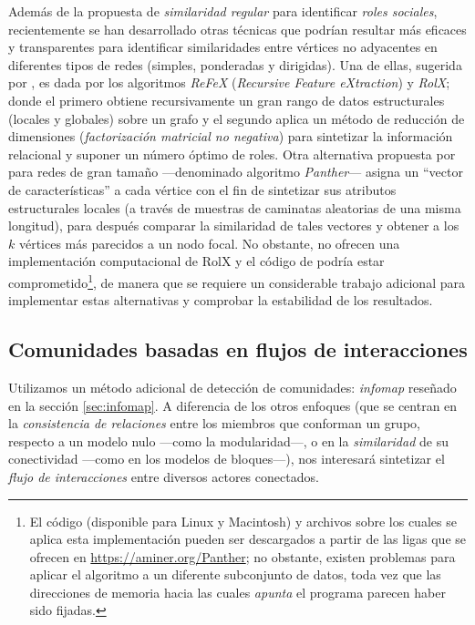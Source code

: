 \documentclass[letterpaper, 11pt]{book}
\theoremstyle{definition}
\theoremstyle{remark}
\begin{document}
Además de la propuesta de \emph{similaridad regular} para identificar \emph{roles sociales}, recientemente se han desarrollado otras técnicas que podrían resultar más eficaces y transparentes para identificar similaridades entre vértices no adyacentes en diferentes tipos de redes (simples, ponderadas y dirigidas). 
Una de ellas, sugerida por \citet{2011_Henderson_RolX}, es dada por los algoritmos \emph{ReFeX} (\emph{Recursive Feature eXtraction}) y \emph{RolX}; donde el primero obtiene recursivamente un gran rango de datos estructurales (locales y globales) sobre un grafo y el segundo aplica un método de reducción de dimensiones (\emph{factorización matricial no negativa}) para sintetizar la información relacional y suponer un número óptimo de roles. 
Otra alternativa propuesta por \citet{2017_Zhang_fastkSim} para redes de gran tamaño ---denominado algoritmo \emph{Panther}--- asigna un ``vector de características'' a cada vértice con el fin de sintetizar sus atributos estructurales locales (a través de muestras de caminatas aleatorias de una misma longitud), para después comparar la similaridad de tales vectores y obtener a los $k$ vértices más parecidos a un nodo focal. 
No obstante, \citet{2011_Henderson_RolX} no ofrecen una implementación computacional de RolX y el código de \citet{2017_Zhang_fastkSim} podría estar comprometido\footnote{
    El código (disponible para Linux y Macintosh) y archivos sobre los cuales se aplica esta implementación pueden ser descargados a partir de las ligas que se ofrecen en \url{https://aminer.org/Panther}; no obstante, existen problemas para aplicar el algoritmo a un diferente subconjunto de datos, toda vez que las direcciones de memoria hacia las cuales \emph{apunta} el programa parecen haber sido fijadas. 
}, 
de manera que se requiere un considerable trabajo adicional para implementar estas alternativas y comprobar la estabilidad de los resultados. 




\subsection{Comunidades basadas en flujos de interacciones}
\label{subsec:infomap__proyec}

Utilizamos un método adicional de detección de comunidades: \emph{infomap} reseñado en la sección \ref{sec:infomap}. 
A diferencia de los otros enfoques (que se centran en la \emph{consistencia de relaciones} entre los miembros que conforman un grupo, respecto a un modelo nulo ---como la modularidad---, o en la \emph{similaridad} de su conectividad ---como en los modelos de bloques---), nos interesará sintetizar el \emph{flujo de interacciones} entre diversos actores conectados. 
\end{document}
